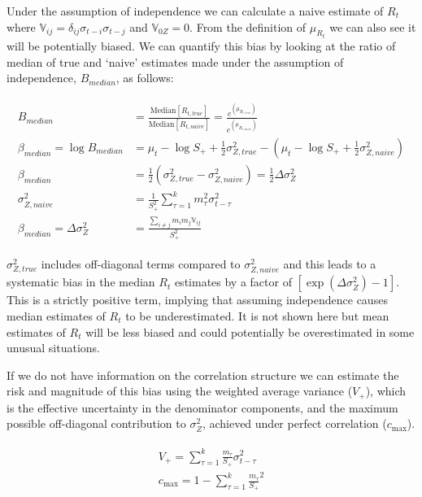 \documentclass[a4paper, 12pt, twoside]{article}
\begin{document}
Under the assumption of independence we can calculate a naive estimate of $R_t$ where $ \mathbb{V}_{ij} = \delta_{ij} \sigma_{t-i} \sigma_{t-j} $ and $\mathbb{V}_{0Z} = 0$. From the definition of $\mu_{R_t}$ we can also see it will be potentially biased. We can quantify this bias by looking at the ratio of median of true and `naive' estimates made under the assumption of independence, $B_{median}$, as follows:

\begin{eqnarray}
\begin{aligned}
B_{median} &= \frac{\text{Median}[R_{t,true}]}{\text{Median}[R_{t,naive}]} =
    \frac{
        e^{(\mu_{R_{t,true}})}
    }{
        e^{(\mu_{R_{t,naive}})}
    } \\
\beta_{median} =  \log B_{median} &=
    \mu_t - \log S_+ + \frac{1}{2}\sigma_{Z,true}^2  -
    (\mu_t - \log S_+ + \frac{1}{2}\sigma_{Z,naive}^2)\\
\beta_{median}  &= \frac{1}{2} ( \sigma_{Z,true}^2 - \sigma_{Z,naive}^2 )   = \frac{1}{2} \Delta \sigma_{Z}^2\\
\sigma_{Z,naive}^2 &= \frac{1}{S_+^2} \sum_{\tau=1}^k m_\tau^2 \sigma_{t-\tau}^2\\
\beta_{median} = \Delta \sigma_{Z}^2  &=  \frac{\sum_{i \ne j} m_i m_j \mathbb{V}_{ij}}{S_+^2}
\end{aligned}
\end{eqnarray}




$ \sigma_{Z,true}^2 $ includes off-diagonal terms compared to $ \sigma_{Z,naive}^2 $ and this leads to a systematic bias in the median $ R_t $ estimates by a factor of $[\exp(\Delta \sigma_Z^2) - 1]$. This is a strictly positive term, implying that assuming independence causes median estimates of $ R_t $ to be underestimated. It is not shown here but mean estimates of $R_t$ will be less biased and could potentially be overestimated in some unusual situations.

If we do not have information on the correlation structure we can estimate the risk and magnitude of this bias using the weighted average variance ($V_+$), which is the effective uncertainty in the denominator components, and the maximum possible off-diagonal contribution to $ \sigma_Z^2 $, achieved under perfect correlation ($c_{\text{max}}$).

\begin{eqnarray}
\begin{aligned}
V_+ = \sum_{\tau=1}^k \frac{m_\tau}{S_+} \sigma_{t-\tau}^2\\
c_{\text{max}} = 1 - \sum_{\tau=1}^k \frac{m_\tau}{S_+}^2
\end{aligned}
\end{eqnarray}
\end{document}
